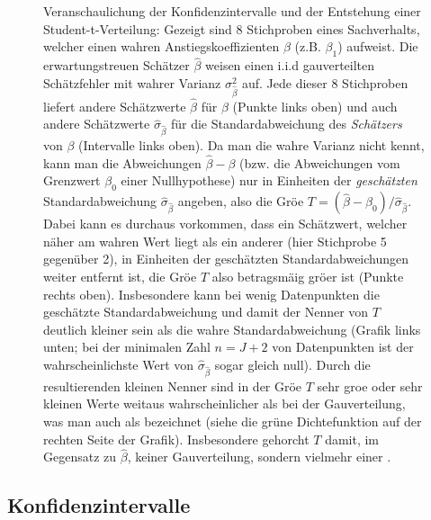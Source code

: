 \begin{figure}
\caption{\label{fig:KI-veranschaulichung}Veranschaulichung der
Konfidenzintervalle und der Entstehung einer Student-t-Verteilung:
Gezeigt sind 8 Stichproben eines Sachverhalts, welcher einen wahren
Anstiegskoeffizienten $\beta$ (z.B. $\beta_1$) aufweist. Die
erwartungstreuen Sch\"atzer $\hat{\beta}$ weisen einen
 i.i.d gau\3verteilten Sch\"atzfehler mit wahrer Varianz
$\sigma_{\hat{\beta}}^2$ auf. Jede dieser 8 Stichproben liefert
andere Sch\"atzwerte $\hat{\beta}$ f\"ur $\beta$ (Punkte links oben) und auch andere 
Sch\"atzwerte $\hat{\sigma}_{\hat{\beta}}$ f\"ur
die Standardabweichung des \emph{Sch\"atzers} von
$\beta$ (Intervalle links oben). Da man die wahre Varianz nicht kennt, kann man die
Abweichungen $\hat{\beta}-\beta$ (bzw. die Abweichungen vom Grenzwert
$\beta_0$ einer Nullhypothese) nur in Einheiten der
\emph{gesch\"atzten} Standardabweichung
$\hat{\sigma}_{\hat{\beta}}$ angeben, also die Gr\"o\3e 
$T=(\hat{\beta}-\beta_0) / \hat{\sigma}_{\hat{\beta}}$. Dabei kann es
durchaus vorkommen, dass ein Sch\"atzwert, 
welcher n\"aher am wahren Wert liegt als ein anderer (hier Stichprobe
5 gegen\"uber 2), in Einheiten der gesch\"atzten Standardabweichungen
weiter entfernt ist, die Gr\"o\3e $T$ also betragsm\"a\3ig gr\"o\3er
ist (Punkte rechts oben).
Insbesondere kann bei wenig Datenpunkten die gesch\"atzte Standardabweichung
und damit der Nenner von $T$ deutlich kleiner sein als die wahre
Standardabweichung (Grafik links unten; bei der minimalen Zahl $n=J+2$ von
Datenpunkten ist der wahrscheinlichste Wert von
$\hat{\sigma}_{\hat{\beta}}$ sogar gleich null). Durch die
resultierenden kleinen Nenner sind in der Gr\"o\3e
$T$ sehr gro\3e oder sehr kleinen Werte weitaus wahrscheinlicher als
bei der Gau\3verteilung, was man auch als 
bezeichnet
 (siehe die gr\"une Dichtefunktion auf
der rechten Seite der Grafik). Insbesondere gehorcht $T$ damit, 
im Gegensatz zu $\hat{\beta}$, keiner Gau\3verteilung, sondern
vielmehr einer
.
}
\end{figure}


\subsection{\label{sec:KI-single}Konfidenzintervalle}


